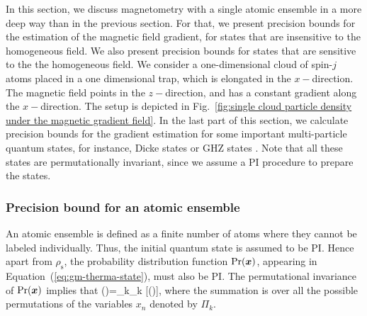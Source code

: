 In this section, we discuss magnetometry with a single
atomic ensemble in a more deep way than in the previous section.
For that, we present precision bounds for
the estimation of the magnetic field gradient, for
states that are insensitive to the homogeneous field.
We also present precision bounds for states that are sensitive to the
the homogeneous field.
We consider a one-dimensional cloud of spin-$j$ atoms
placed in a one dimensional trap, which is elongated
in the  $x-$direction.
The magnetic field points in the  $z-$direction,
and has a constant gradient along the $x-$direction.
The setup is depicted
in Fig.~\ref{fig:single cloud particle density under the magnetic gradient field}.
In the last part of this section, we calculate precision bounds for the
gradient estimation for some important multi-particle quantum states,
for instance, Dicke states \cite{} or
GHZ states \cite{Greenberger1990}.
Note that all these states are permutationally invariant, since we
assume a PI procedure to prepare the states.

\subsubsection{Precision bound for an atomic ensemble}

An atomic ensemble is defined as a finite number of atoms where
they cannot be labeled individually.
Thus, the initial quantum state is assumed to be PI.
Hence apart from $\rho_{\text{s}}$, the probability distribution function
$\text{Pr}(\boldsymbol{x})$, appearing in Equation~(\ref{eq:gm-therma-state}),
must also be PI.
The permutational invariance of $\text{Pr}(\boldsymbol{x})$ implies that
\be
\label{eq:gm-pi-for-pdf}
\prob()=\sum_{k}\Pi_k [\prob()],
\ee
where the summation is over all the possible permutations
of the variables $x_n$ denoted by
$\Pi_k.$

